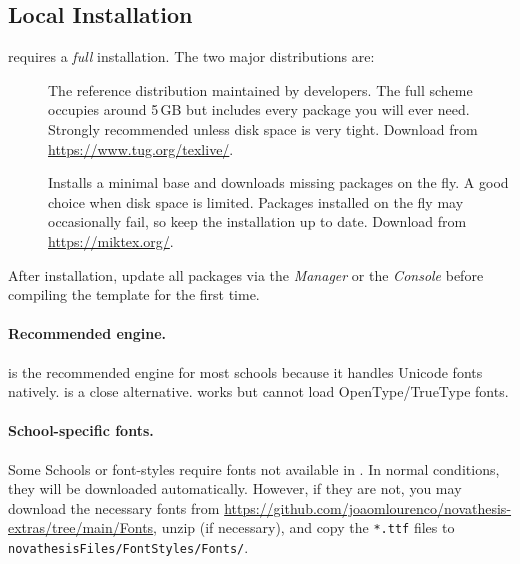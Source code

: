 \subsection{Local  Installation}
\label{sub:local_install}

\novathesis{} requires a \emph{full}  installation.  The two
major distributions are:

\begin{description}
  \item[] The reference distribution maintained by  developers.
    The full scheme occupies around 5\,GB but includes every package you will
    ever need.  Strongly recommended unless disk space is very tight.
    Download from \url{https://www.tug.org/texlive/}.

  \item[] Installs a minimal base and downloads missing packages on the
    fly.  A good choice when disk space is limited.  Packages installed on
    the fly may occasionally fail, so keep the installation up to date.
    Download from \url{https://miktex.org/}.
\end{description}

After installation, update all packages via the \emph{ Manager} or
the \emph{ Console} before compiling the template for the first time.

\paragraph{Recommended engine.}   is the recommended engine for most
schools because it handles Unicode fonts natively.   is a close
alternative.   works but cannot load OpenType/TrueType fonts.

\paragraph{School-specific fonts.}  Some Schools or font-styles require fonts not available in .  In normal conditions, they will be downloaded automatically.  However, if they are not, you may download the necessary fonts from \url{https://github.com/joaomlourenco/novathesis-extras/tree/main/Fonts}, unzip (if necessary), and copy the \verb!*.ttf! files to \verb!novathesisFiles/FontStyles/Fonts/!.

